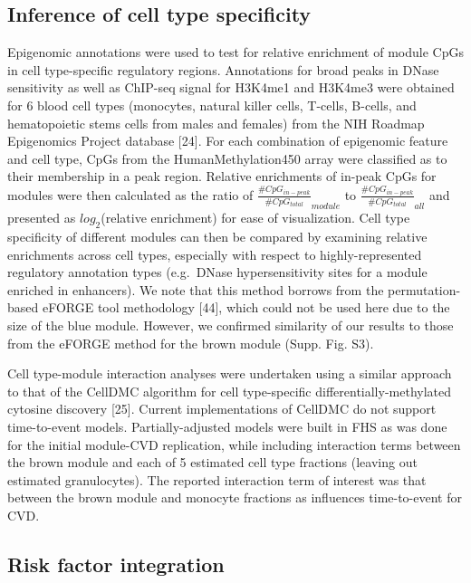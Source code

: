 \documentclass[]{bmcart}
\begin{document}
\subsection{Inference of cell type
specificity}\label{inference-of-cell-type-specificity}

Epigenomic annotations were used to test for relative enrichment of
module CpGs in cell type-specific regulatory regions. Annotations for
broad peaks in DNase sensitivity as well as ChIP-seq signal for H3K4me1
and H3K4me3 were obtained for 6 blood cell types (monocytes, natural
killer cells, T-cells, B-cells, and hematopoietic stems cells from males
and females) from the NIH Roadmap Epigenomics Project database {[}24{]}.
For each combination of epigenomic feature and cell type, CpGs from the
HumanMethylation450 array were classified as to their membership in a
peak region. Relative enrichments of in-peak CpGs for modules were then
calculated as the ratio of
\(\frac{\#CpG_{in-peak}}{\#CpG_{total}}_{module}\) to
\(\frac{\#CpG_{in-peak}}{\#CpG_{total}}_{all}\) and presented as
\(log_2\)(relative enrichment) for ease of visualization. Cell type
specificity of different modules can then be compared by examining
relative enrichments across cell types, especially with respect to
highly-represented regulatory annotation types (e.g.~DNase
hypersensitivity sites for a module enriched in enhancers). We note that
this method borrows from the permutation-based eFORGE tool methodology
{[}44{]}, which could not be used here due to the size of the blue
module. However, we confirmed similarity of our results to those from
the eFORGE method for the brown module (Supp. Fig. S3).

Cell type-module interaction analyses were undertaken using a similar
approach to that of the CellDMC algorithm for cell type-specific
differentially-methylated cytosine discovery {[}25{]}. Current
implementations of CellDMC do not support time-to-event models.
Partially-adjusted models were built in FHS as was done for the initial
module-CVD replication, while including interaction terms between the
brown module and each of 5 estimated cell type fractions (leaving out
estimated granulocytes). The reported interaction term of interest was
that between the brown module and monocyte fractions as influences
time-to-event for CVD.

\subsection{Risk factor integration}\label{risk-factor-integration}
\end{document}
